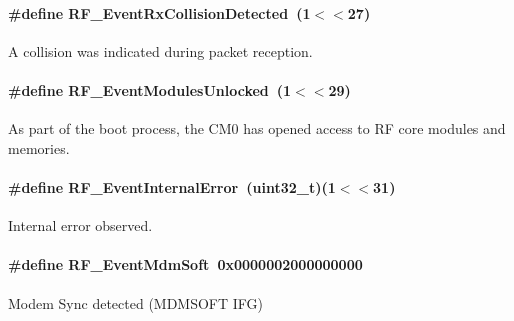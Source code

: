 \paragraph[{R\+F\+\_\+\+Event\+Rx\+Collision\+Detected}]{\setlength{\rightskip}{0pt plus 5cm}\#define R\+F\+\_\+\+Event\+Rx\+Collision\+Detected~(1$<$$<$27)}\label{group___r_f___core___events_gaaba4e22e27b9ac26244b02c7cfd657d0}


A collision was indicated during packet reception. 

\paragraph[{R\+F\+\_\+\+Event\+Modules\+Unlocked}]{\setlength{\rightskip}{0pt plus 5cm}\#define R\+F\+\_\+\+Event\+Modules\+Unlocked~(1$<$$<$29)}\label{group___r_f___core___events_gae5cb277f5a7a23bf1d7e6405f3e2253e}


As part of the boot process, the C\+M0 has opened access to R\+F core modules and memories. 

\paragraph[{R\+F\+\_\+\+Event\+Internal\+Error}]{\setlength{\rightskip}{0pt plus 5cm}\#define R\+F\+\_\+\+Event\+Internal\+Error~(uint32\+\_\+t)(1$<$$<$31)}\label{group___r_f___core___events_gaf872a5a1a47d7401499d7826eea8da98}


Internal error observed. 

\paragraph[{R\+F\+\_\+\+Event\+Mdm\+Soft}]{\setlength{\rightskip}{0pt plus 5cm}\#define R\+F\+\_\+\+Event\+Mdm\+Soft~0x0000002000000000}\label{group___r_f___core___events_ga83edee28803f1b2addc0f8458d0cc657}


Modem Sync detected (M\+D\+M\+S\+O\+F\+T I\+F\+G) 

